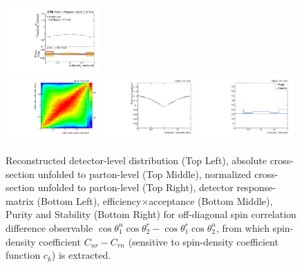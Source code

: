 \begin{refsection}
\begin{figure}[htb]
\begin{center}
 \includegraphics[width=0.32\textwidth]{fig_fullRun2UL/unfolding/combined/UnfoldedResultsNorm_c_Mnr.pdf} \\
 \includegraphics[width=0.32\textwidth]{fig_fullRun2UL/unfolding/combined/ResponseMatrix_c_Mnr.pdf}
 \includegraphics[width=0.32\textwidth]{fig_fullRun2UL/unfolding/combined/TotEff_c_Mnr.pdf}
 \includegraphics[width=0.32\textwidth]{fig_fullRun2UL/unfolding/combined/PurStab_c_Mnr.pdf} \\
\caption{Reconstructed detector-level distribution (Top Left), absolute cross-section unfolded to parton-level (Top Middle), normalized cross-section unfolded to parton-level (Top Right), detector response-matrix (Bottom Left), efficiency$\times$acceptance (Bottom Middle), Purity and Stability (Bottom Right) for off-diagonal spin correlation difference observable $\cos\theta_{1}^{n}\cos\theta_{2}^{r}-\cos\theta_{1}^{r}\cos\theta_{2}^{n}$, from which spin-density coefficient $C_{nr}-C_{rn}$ (sensitive to spin-density coefficient function $c_k$) is extracted.}
\label{fig:c_Mnr}
\end{center}
\end{figure}
\clearpage
\begin{figure}[htb]
\begin{center}

\end{center}
\end{figure}
\end{refsection}
